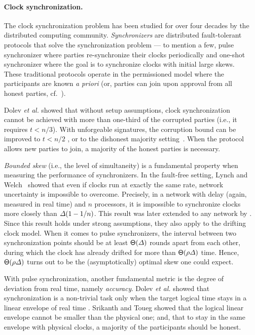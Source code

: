 \paragraph{Clock synchronization.}
%
The clock synchronization problem has been studied for over four decades by the distributed computing community.
%
\emph{Synchronizers} are distributed fault-tolerant protocols that solve the synchronization problem --- to mention a few, pulse synchronizer \cite{JACM:LamMel85,PODC:LunLyn84,PODC:HSSD84,JACM:SriTou87,PODC:LenLos22} where parties re-synchronize their clocks periodically and one-shot synchronizer \cite{InfCon:LunLyn84,JoComp:HalMegMun85} where the goal is to synchronize clocks with initial large skews.
%
These traditional protocols operate in the permissioned model where the participants are known \emph{a priori} (or, parties can join upon approval from all honest parties, cf.~\cite{PODC:HSSD84}).

Dolev \textit{et al.} \cite{JCSS:DHS86} showed that without setup assumptions, clock synchronization cannot be achieved with more than one-third of the corrupted parties (i.e., it requires $t < n / 3$).
%
With unforgeable signatures, the corruption bound can be improved to $t < n / 2$ \cite{JACM:SriTou87,PODC:LenLos22}, or to the dishonest majority setting~\cite{PODC:HSSD84}.
%
When the protocol allows new parties to join, a majority of the honest parties is necessary.

\emph{Bounded skew} (i.e., the level of simultaneity) is a fundamental property when measuring the performance of synchronizers.
%
In the fault-free setting, Lynch and Welch~\cite{InfCon:LunLyn84} showed that even if clocks run at exactly the same rate, network uncertainty is impossible to overcome.
%
Precisely, in a network with \delay delay (again, measured in real time) and $n$ processors, it is impossible to synchronize clocks more closely than $\varDelta (1 - 1 / n)$.
%
This result was later extended to any network by \cite{JoComp:HalMegMun85}.
%
Since this result holds under strong assumptions, they also apply to the drifting clock model.
%
When it comes to pulse synchronizers, the interval between two synchronization points should be at least $\mathsf{\Theta}(\varDelta)$ rounds apart from each other, during which the clock has already drifted for more than $\mathsf{\Theta}(\rho \varDelta)$ time.
%
Hence, $\mathsf{\Theta}(\rho \varDelta)$ turns out to be the (asymptotically) optimal skew one could expect.

With pulse synchronization, another fundamental metric is the degree of deviation from real time, namely \emph{accuracy}.
%
Dolev \textit{et al.} showed that synchronization is a non-trivial task only when the target logical time stays in a linear envelope of real time \cite{JCSS:DHS86}.
%
Srikanth and Toueg \cite{JACM:SriTou87} showed that the logical linear envelope cannot be smaller than the physical one; and, that to stay in the same envelope with physical clocks, a majority of the participants should be honest.

